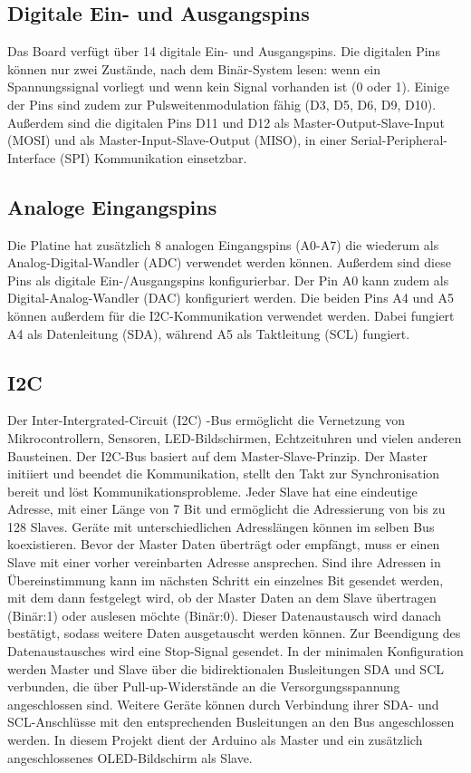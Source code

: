 \subsection{Digitale Ein- und Ausgangspins}
Das Board verfügt über 14 digitale Ein- und Ausgangspins. Die digitalen Pins können nur zwei Zustände, nach dem Binär-System lesen: wenn ein Spannungssignal vorliegt und wenn kein Signal vorhanden ist (0 oder 1). Einige der Pins sind zudem zur Pulsweitenmodulation fähig (D3, D5, D6, D9, D10). Außerdem sind die digitalen Pins D11 und D12 als Master-Output-Slave-Input (MOSI) und als Master-Input-Slave-Output (MISO), in einer Serial-Peripheral-Interface (SPI) Kommunikation einsetzbar.\cite{Ard.2024}

\subsection{Analoge Eingangspins}
Die Platine hat zusätzlich 8 analogen Eingangspins (A0-A7) die wiederum als Analog-Digital-Wandler (ADC) verwendet werden können. Außerdem sind diese Pins als digitale Ein-/Ausgangspins konfigurierbar. Der Pin A0 kann zudem als Digital-Analog-Wandler (DAC) konfiguriert werden. Die beiden Pins A4 und A5 können außerdem für die I2C-Kommunikation verwendet werden. Dabei fungiert A4 als Datenleitung (SDA), während A5 als Taktleitung (SCL) fungiert.
\subsection{I2C}
Der Inter-Intergrated-Circuit (I2C) -Bus ermöglicht die Vernetzung von Mikrocontrollern, Sensoren, LED-Bildschirmen, Echtzeituhren und vielen anderen Bausteinen.
Der I2C-Bus basiert auf dem Master-Slave-Prinzip. Der Master initiiert und beendet die Kommunikation, stellt den Takt zur Synchronisation bereit und löst Kommunikationsprobleme. Jeder Slave hat eine eindeutige Adresse, mit einer Länge von 7 Bit und ermöglicht die Adressierung von bis zu 128 Slaves. Geräte mit unterschiedlichen Adresslängen können im selben Bus koexistieren. Bevor der Master Daten überträgt oder empfängt, muss er einen Slave mit einer vorher vereinbarten Adresse ansprechen.\cite{Meroth.2018}\cite{STM1.2015} Sind ihre Adressen in Übereinstimmung kann im nächsten Schritt ein einzelnes Bit gesendet werden, mit dem dann festgelegt wird, ob der Master Daten an dem Slave übertragen (Binär:1) oder auslesen möchte (Binär:0). Dieser Datenaustausch wird danach bestätigt, sodass weitere Daten ausgetauscht werden können. Zur Beendigung des Datenaustausches wird eine Stop-Signal gesendet.\cite{Gehrke.2022} In der minimalen Konfiguration werden Master und Slave über die bidirektionalen Busleitungen SDA und SCL verbunden, die über Pull-up-Widerstände an die Versorgungsspannung angeschlossen sind. Weitere Geräte können durch Verbindung ihrer SDA- und SCL-Anschlüsse mit den entsprechenden Busleitungen an den Bus angeschlossen werden.\cite{Meroth.2018} In diesem Projekt dient der Arduino als Master und ein zusätzlich angeschlossenes OLED-Bildschirm als Slave.

